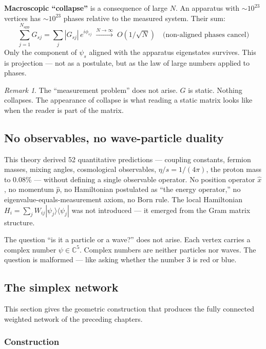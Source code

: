 \documentclass[12pt]{article}
\theoremstyle{remark}
\newtheorem{remark}[theorem]{Remark}
\theoremstyle{definition}
\begin{document}
\textbf{Macroscopic ``collapse''} is a consequence of large $N$. An apparatus with $\sim\!10^{23}$ vertices has $\sim\!10^{23}$ phases relative to the measured system. Their sum:
\begin{equation}
\sum_{j=1}^{N_\text{app}} G_{sj} = \sum_{j} |G_{sj}|\,e^{i\phi_{sj}} \;\xrightarrow{N \to \infty}\; O(1/\sqrt{N}) \quad\text{(non-aligned phases cancel)}
\end{equation}
Only the component of $\psi_s$ aligned with the apparatus eigenstates survives. This is projection --- not as a postulate, but as the law of large numbers applied to phases.

\begin{remark}
The ``measurement problem'' does not arise. $G$ is static. Nothing collapses. The appearance of collapse is what reading a static matrix looks like when the reader is part of the matrix.
\end{remark}

\subsection{No observables, no wave-particle duality}

This theory derived 52 quantitative predictions --- coupling constants, fermion masses, mixing angles, cosmological observables, $\eta/s = 1/(4\pi)$, the proton mass to 0.08\% --- without defining a single observable operator. No position operator $\hat{x}$, no momentum $\hat{p}$, no Hamiltonian postulated as ``the energy operator,'' no eigenvalue-equals-measurement axiom, no Born rule. The local Hamiltonian $H_i = \sum_j W_{ij}|\psi_j\rangle\langle\psi_j|$ was not introduced --- it emerged from the Gram matrix structure.

The question ``is it a particle or a wave?'' does not arise. Each vertex carries a complex number $\psi \in \mathbb{C}^5$. Complex numbers are neither particles nor waves. The question is malformed --- like asking whether the number 3 is red or blue.

\subsection{The simplex network}

This section gives the geometric construction that produces the fully connected weighted network of the preceding chapters.

\subsubsection{Construction}
\end{document}
